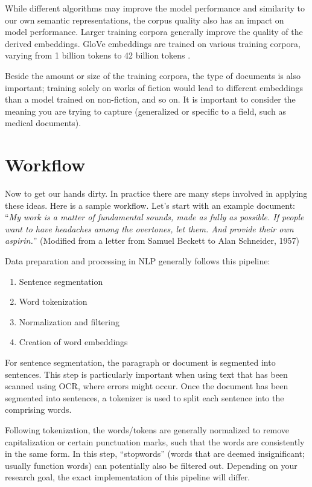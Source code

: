 While different algorithms may improve the model performance and similarity to our own semantic representations, the corpus quality also has an impact on model performance.
Larger training corpora generally improve the quality of the derived embeddings. 
GloVe embeddings are trained on various training corpora, varying from 1 billion tokens to 42 billion tokens \cite{pennington2014glove}.

Beside the amount or size of the training corpora, the type of documents is also important; training solely on works of fiction would lead to different embeddings than a model trained on non-fiction, and so on. It is important to consider the meaning you are trying to capture (generalized or specific to a field, such as medical documents).

\section{Workflow}

Now to get our hands dirty. In practice there are many steps involved in applying these ideas. 
Here is a sample workflow. Let's start with an example document: ``\textit{My work is a matter of fundamental sounds, made as fully as possible. If people want to have headaches among the overtones, let them. And provide their own aspirin.}'' (Modified from a letter from Samuel Beckett to Alan Schneider, 1957)

Data preparation and processing in NLP generally follows this pipeline: 

\begin{enumerate}
\item Sentence segmentation
\item Word tokenization
\item Normalization and filtering
\item Creation of word embeddings
\end{enumerate}

For sentence segmentation, the paragraph or document is segmented into sentences. This step is particularly important when using text that has been scanned using OCR, where errors might occur.
Once the document has been segmented into sentences, a tokenizer is used to split each sentence into the comprising words. 

Following tokenization, the words/tokens are generally normalized to remove capitalization or certain punctuation marks, such that the words are consistently in the same form.
In this step, ``stopwords'' (words that are deemed insignificant; usually function words) can potentially also be filtered out.
Depending on your research goal, the exact implementation of this pipeline will differ.


